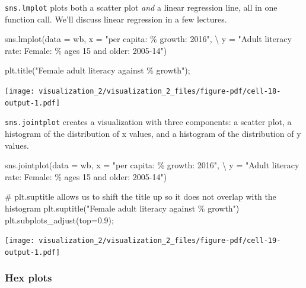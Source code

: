 \documentclass[
  letterpaper,
  DIV=11,
  numbers=noendperiod]{scrreprt}
\newenvironment{Shaded}{\begin{snugshade}}{\end{snugshade}}
\newcommand{\CommentTok}[1]{\textcolor[rgb]{0.37,0.37,0.37}{#1}}
\newcommand{\FloatTok}[1]{\textcolor[rgb]{0.68,0.00,0.00}{#1}}
\newcommand{\NormalTok}[1]{\textcolor[rgb]{0.00,0.23,0.31}{#1}}
\newcommand{\OperatorTok}[1]{\textcolor[rgb]{0.37,0.37,0.37}{#1}}
\newcommand{\SpecialCharTok}[1]{\textcolor[rgb]{0.37,0.37,0.37}{#1}}
\newcommand{\StringTok}[1]{\textcolor[rgb]{0.13,0.47,0.30}{#1}}
\begin{document}
\texttt{sns.lmplot} plots both a scatter plot \emph{and} a linear
regression line, all in one function call. We'll discuss linear
regression in a few lectures.

\begin{Shaded}
\begin{Highlighting}[]
\NormalTok{sns.lmplot(data }\OperatorTok{=}\NormalTok{ wb, x }\OperatorTok{=} \StringTok{"per capita: }\SpecialCharTok{\% g}\StringTok{rowth: 2016"}\NormalTok{, }\OperatorTok{\textbackslash{}}
\NormalTok{           y }\OperatorTok{=} \StringTok{"Adult literacy rate: Female: \% ages 15 and older: 2005{-}14"}\NormalTok{)}

\NormalTok{plt.title(}\StringTok{"Female adult literacy against }\SpecialCharTok{\% g}\StringTok{rowth"}\NormalTok{)}\OperatorTok{;}
\end{Highlighting}
\end{Shaded}

\texttt{[image: visualization\_2/visualization\_2\_files/figure-pdf/cell-18-output-1.pdf]}

\texttt{sns.jointplot} creates a visualization with three components: a
scatter plot, a histogram of the distribution of x values, and a
histogram of the distribution of y values.

\begin{Shaded}
\begin{Highlighting}[]
\NormalTok{sns.jointplot(data }\OperatorTok{=}\NormalTok{ wb, x }\OperatorTok{=} \StringTok{"per capita: }\SpecialCharTok{\% g}\StringTok{rowth: 2016"}\NormalTok{, }\OperatorTok{\textbackslash{}}
\NormalTok{           y }\OperatorTok{=} \StringTok{"Adult literacy rate: Female: \% ages 15 and older: 2005{-}14"}\NormalTok{)}

\CommentTok{\# plt.suptitle allows us to shift the title up so it does not overlap with the histogram}
\NormalTok{plt.suptitle(}\StringTok{"Female adult literacy against }\SpecialCharTok{\% g}\StringTok{rowth"}\NormalTok{)}
\NormalTok{plt.subplots\_adjust(top}\OperatorTok{=}\FloatTok{0.9}\NormalTok{)}\OperatorTok{;}
\end{Highlighting}
\end{Shaded}

\texttt{[image: visualization\_2/visualization\_2\_files/figure-pdf/cell-19-output-1.pdf]}

\subsubsection{Hex plots}\label{hex-plots}
\end{document}
